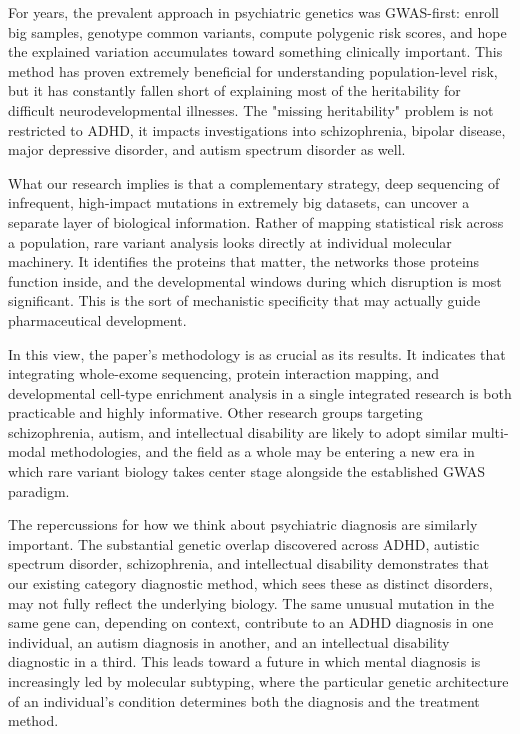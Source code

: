 For years, the prevalent approach in psychiatric genetics was GWAS-first: enroll big samples, genotype common variants, compute polygenic risk scores, and hope the explained variation accumulates toward something clinically important.  This method has proven extremely beneficial for understanding population-level risk, but it has constantly fallen short of explaining most of the heritability for difficult neurodevelopmental illnesses.  The "missing heritability" problem is not restricted to ADHD, it impacts investigations into schizophrenia, bipolar disease, major depressive disorder, and autism spectrum disorder as well.  

What our research implies is that a complementary strategy, deep sequencing of infrequent, high-impact mutations in extremely big datasets, can uncover a separate layer of biological information.  Rather of mapping statistical risk across a population, rare variant analysis looks directly at individual molecular machinery.  It identifies the proteins that matter, the networks those proteins function inside, and the developmental windows during which disruption is most significant.  This is the sort of mechanistic specificity that may actually guide pharmaceutical development.  

In this view, the paper's methodology is as crucial as its results.  It indicates that integrating whole-exome sequencing, protein interaction mapping, and developmental cell-type enrichment analysis in a single integrated research is both practicable and highly informative.  Other research groups targeting schizophrenia, autism, and intellectual disability are likely to adopt similar multi-modal methodologies, and the field as a whole may be entering a new era in which rare variant biology takes center stage alongside the established GWAS paradigm.  

The repercussions for how we think about psychiatric diagnosis are similarly important.  The substantial genetic overlap discovered across ADHD, autistic spectrum disorder, schizophrenia, and intellectual disability demonstrates that our existing category diagnostic method, which sees these as distinct disorders, may not fully reflect the underlying biology.  The same unusual mutation in the same gene can, depending on context, contribute to an ADHD diagnosis in one individual, an autism diagnosis in another, and an intellectual disability diagnostic in a third.  This leads toward a future in which mental diagnosis is increasingly led by molecular subtyping, where the particular genetic architecture of an individual's condition determines both the diagnosis and the treatment method.